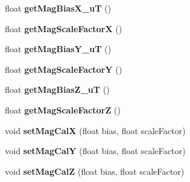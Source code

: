 \begin{DoxyCompactItemize}
\mbox{\label{class_m_p_u9250_a9bb3dfd24f86ce01d45cc34759eff5f5}} 
float {\bfseries get\+Mag\+Bias\+X\+\_\+uT} ()
\item 
\mbox{\label{class_m_p_u9250_a9ae0353e7326ba32a11422b3bc7b5cee}} 
float {\bfseries get\+Mag\+Scale\+FactorX} ()
\item 
\mbox{\label{class_m_p_u9250_a7f9328b066c9c07887c5c79fff33554c}} 
float {\bfseries get\+Mag\+Bias\+Y\+\_\+uT} ()
\item 
\mbox{\label{class_m_p_u9250_a5457ecd92f0c920312af61df0c1bb1b3}} 
float {\bfseries get\+Mag\+Scale\+FactorY} ()
\item 
\mbox{\label{class_m_p_u9250_a23d0c81842120b27af379961b773465f}} 
float {\bfseries get\+Mag\+Bias\+Z\+\_\+uT} ()
\item 
\mbox{\label{class_m_p_u9250_a859590996f4e1673d0f21eabe5e1a2f4}} 
float {\bfseries get\+Mag\+Scale\+FactorZ} ()
\item 
\mbox{\label{class_m_p_u9250_a063be654730f719544be8a7ce39a433c}} 
void {\bfseries set\+Mag\+CalX} (float bias, float scale\+Factor)
\item 
\mbox{\label{class_m_p_u9250_af85a3badd3f79969c4715fceec962e39}} 
void {\bfseries set\+Mag\+CalY} (float bias, float scale\+Factor)
\item 
\mbox{\label{class_m_p_u9250_a36fab1c8d06aa5dcd0e6a4014d7ca5e7}} 
void {\bfseries set\+Mag\+CalZ} (float bias, float scale\+Factor)
\end{DoxyCompactItemize}
